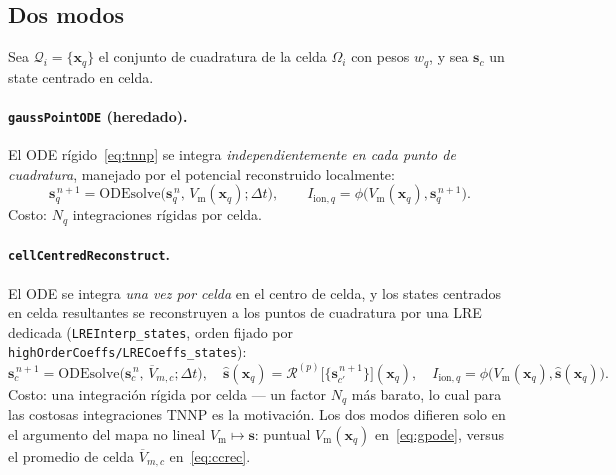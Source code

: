 \documentclass[11pt,a4paper]{article}
\newcommand{\code}[1]{\texttt{\small #1}}
\newcommand{\Vm}{V_{\text{m}}}
\newcommand{\Iionsub}[1]{I_{\mathrm{ion},#1}}
\newcommand{\dictkey}[1]{\textcolor{black!60!green}{\texttt{\footnotesize #1}}}
\begin{document}
\subsection{Dos modos}

Sea $\mathcal{Q}_i=\{\mathbf{x}_q\}$ el conjunto de cuadratura de la celda
$\Omega_i$ con pesos $w_q$, y sea $\mathbf{s}_c$ un state centrado en celda.

\paragraph{\code{gaussPointODE} (heredado).}
El ODE rígido~\eqref{eq:tnnp} se integra \emph{independientemente en cada punto de
cuadratura}, manejado por el potencial reconstruido localmente:
\begin{equation}
  \mathbf{s}_q^{\,n+1}
   = \mathrm{ODEsolve}\!\bigl(\mathbf{s}_q^{\,n},\,\Vm(\mathbf{x}_q);\Delta t\bigr),
  \qquad
  \Iionsub{q}=\phi\bigl(\Vm(\mathbf{x}_q),\mathbf{s}_q^{\,n+1}\bigr).
  \label{eq:gpode}
\end{equation}
Costo: $N_q$ integraciones rígidas por celda.

\paragraph{\code{cellCentredReconstruct}.}
El ODE se integra \emph{una vez por celda} en el centro de celda, y los states
centrados en celda resultantes se reconstruyen a los puntos de cuadratura por una
LRE dedicada (\code{LREInterp\_states}, orden fijado por
\dictkey{highOrderCoeffs/LRECoeffs\_states}):
\begin{equation}
  \mathbf{s}_c^{\,n+1}
   = \mathrm{ODEsolve}\!\bigl(\mathbf{s}_c^{\,n},\,\overline{V}_{m,c};\Delta t\bigr),
  \quad
  \widehat{\mathbf{s}}(\mathbf{x}_q)
   = \mathcal{R}^{(p)}\!\bigl[\{\mathbf{s}_{c'}^{\,n+1}\}\bigr](\mathbf{x}_q),
  \quad
  \Iionsub{q}=\phi\bigl(\Vm(\mathbf{x}_q),\widehat{\mathbf{s}}(\mathbf{x}_q)\bigr).
  \label{eq:ccrec}
\end{equation}
Costo: una integración rígida por celda --- un factor $N_q$ más barato, lo cual
para las costosas integraciones TNNP es la motivación. Los dos modos difieren solo
en el argumento del mapa no lineal $\Vm\!\mapsto\!\mathbf{s}$: puntual
$\Vm(\mathbf{x}_q)$ en~\eqref{eq:gpode}, versus el promedio de celda
$\overline{V}_{m,c}$ en~\eqref{eq:ccrec}.

\end{document}
